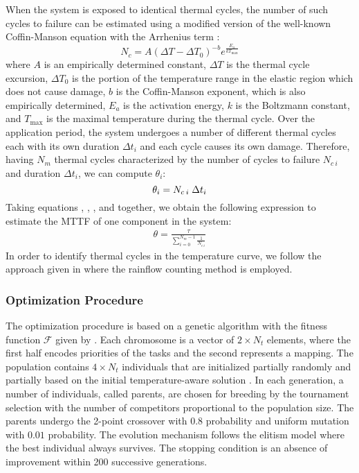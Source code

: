When the system is exposed to identical thermal cycles, the number of such
cycles to failure can be estimated using a modified version of the well-known
Coffin-Manson equation with the Arrhenius term \cite{xiang2010, jedec2010}:
\[
  N_c = A (\Delta T - \Delta T_0)^{-b} e^{\frac{E_a}{k T_\text{max}}}
\]
where $A$ is an empirically determined constant, $\Delta T$ is the thermal cycle
excursion, $\Delta T_0$ is the portion of the temperature range in the elastic
region which does not cause damage, $b$ is the Coffin-Manson exponent, which is
also empirically determined, $E_{a}$ is the activation energy, $k$ is the
Boltzmann constant, and $T_\text{max}$ is the maximal temperature during the
thermal cycle. Over the application period, the system undergoes a number of
different thermal cycles each with its own duration $\Delta t_i$ and each cycle
causes its own damage. Therefore, having $N_m$ thermal cycles characterized by
the number of cycles to failure $N_{c\:i}$ and duration $\Delta t_i$, we can
compute $\theta_i$:
\begin{equation} \elab{mttf-cycle}
  \theta_i = N_{c \: i} \; \Delta t_i
\end{equation}
Taking equations , , , and
 together, we obtain the following expression to estimate the
MTTF of one component in the system:
\begin{align}
  \theta = \frac{\tau}{\sum_{i=0}^{N_m - 1} \frac{1}{N_{c \: i}}}
\end{align}
In order to identify thermal cycles in the temperature curve, we follow the
approach given in \cite{xiang2010} where the rainflow counting method is
employed.

\subsubsection{Optimization Procedure} 

The optimization procedure is based on a genetic algorithm \cite{schmitz2004}
with the fitness function $\mathcal{F}$ given by . Each
chromosome is a vector of $2 \times N_t$ elements, where the first half encodes
priorities of the tasks and the second represents a mapping. The population
contains $4 \times N_t$ individuals that are initialized partially randomly and
partially based on the initial temperature-aware solution \cite{xie2006}. In
each generation, a number of individuals, called parents, are chosen for
breeding by the tournament selection with the number of competitors proportional
to the population size. The parents undergo the 2-point crossover with $0.8$
probability and uniform mutation with $0.01$ probability. The evolution
mechanism follows the elitism model where the best individual always survives.
The stopping condition is an absence of improvement within 200 successive
generations.

